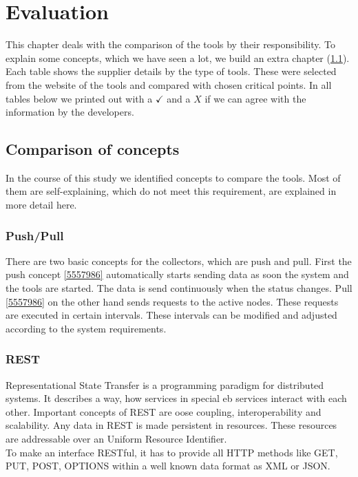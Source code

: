 \chapter{Evaluation} %
This chapter deals with the comparison of the tools by their responsibility. To explain some concepts, which we have seen a lot, we build an extra chapter (\cref{concepts}).
Each table shows the supplier details by the type of tools. These were selected from the website of the tools and compared with chosen critical points.
In all tables below we printed out with a $ \checkmark $ and a $ X $ if we can agree with the information by the developers.

\section{Comparison of concepts}
\label{concepts}
In the course of this study we identified concepts to compare the tools. Most of them are self-explaining, which do not meet this requirement, are explained in more detail here.
\subsection{Push/Pull}
\label{push/pull}
There are two basic concepts for the collectors, which are push and pull. First the push concept \cref{5557986} automatically starts sending data as soon the system and the tools are started. The data is send continuously when the status changes.
Pull \cref{5557986} on the other hand sends requests to the active nodes. These requests are executed in certain intervals. These intervals can be modified and adjusted according to the system requirements.
\subsection{REST}
\label{rest}
Representational State Transfer is a programming paradigm for distributed systems. It describes a way, how services in special eb services interact with each other. Important concepts of REST are oose coupling, interoperability and scalability. Any data in REST is made persistent in resources. These resources are addressable over an Uniform Resource Identifier. \\
To make an interface RESTful, it has to provide all HTTP methods like GET, PUT, POST, OPTIONS within a well known data format as XML or JSON.


